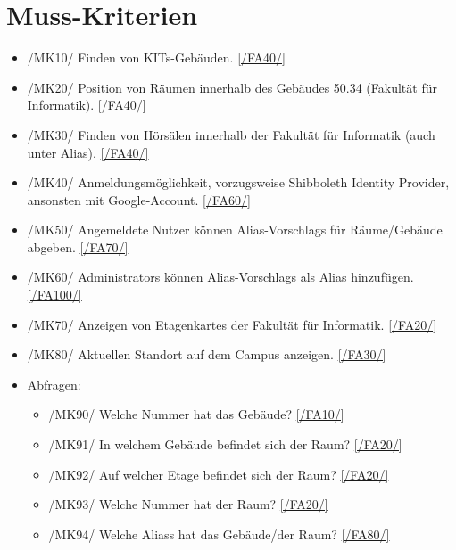 \section{Muss-Kriterien}

\begin{itemize}

    \item{/MK10/} \label{/MK10/}Finden von \Glspl{KIT}-Gebäuden. \ref{/FA40/}
    \item{/MK20/} \label{/MK20/}Position von Räumen innerhalb des Gebäudes 50.34 (Fakultät für Informatik). \ref{/FA40/}
    \item{/MK30/} \label{/MK30/}Finden von Hörsälen innerhalb der Fakultät für Informatik (auch unter Alias). \ref{/FA40/}
    \item{/MK40/} \label{/MK40/}Anmeldungsmöglichkeit, vorzugsweise Shibboleth Identity Provider, ansonsten mit Google-Account. \ref{/FA60/}
    \item{/MK50/} \label{/MK50/}Angemeldete Nutzer können \Glspl{Alias-Vorschlag} für Räume/Gebäude abgeben. \ref{/FA70/}
    \item{/MK60/} \label{/MK60/}\Glspl{Administrator} können \Glspl{Alias-Vorschlag} als \Gls{Alias} hinzufügen. \ref{/FA100/}
    \item{/MK70/} \label{/MK70/}Anzeigen von \Glspl{Etagenkarte} der Fakultät für Informatik. \ref{/FA20/}
    \item{/MK80/} \label{/MK80/}Aktuellen Standort auf dem \Gls{Campus} anzeigen. \ref{/FA30/}
    \item Abfragen:
        \begin{itemize}
            \item{/MK90/} \label{/MK90/}Welche Nummer hat das Gebäude? \ref{/FA10/}
            \item{/MK91/} \label{/MK91/}In welchem Gebäude befindet sich der Raum? \ref{/FA20/}
            \item{/MK92/} \label{/MK92/}Auf welcher Etage befindet sich der Raum? \ref{/FA20/}
            \item{/MK93/} \label{/MK93/}Welche Nummer hat der Raum? \ref{/FA20/}
            \item{/MK94/} \label{/MK94/}Welche \Glspl{Alias} hat das Gebäude/der Raum? \ref{/FA80/}
        \end{itemize}

\end{itemize}

